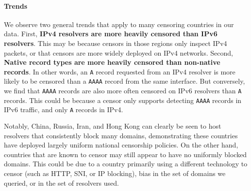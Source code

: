 



%




\paragraph{Trends}
We observe two general trends that apply to many censoring countries in our data.
First, \textbf{IPv4 resolvers are more heavily censored than IPv6 resolvers}.
This may be because censors in those regions only inspect IPv4 packets, or that
censors are more widely deployed on IPv4 networks. Second, \textbf{Native record
types are more heavily censored than non-native records}. In other words, an
\texttt{A} record requested from an IPv4 resolver is more likely to be censored
than a \texttt{AAAA} record from the same interface. But conversely, we find
that \texttt{AAAA} records are also more often censored on IPv6 resolvers than
\texttt{A} records. This could be because a censor only supports detecting
\texttt{AAAA} records in IPv6 traffic, and only \texttt{A} records in IPv4.


Notably, China, Russia, Iran, and Hong Kong can clearly be seen to host
resolvers that consistently block many domains, demonstrating these countries have
deployed largely uniform national censorship policies. On the other hand,
countries that are known to censor may still appear to have no uniformly blocked
domains. This could be due to a country primarily using a different technology
to censor (such as HTTP, SNI, or IP blocking), bias in the set of domains we
queried, or in the set of resolvers used.

